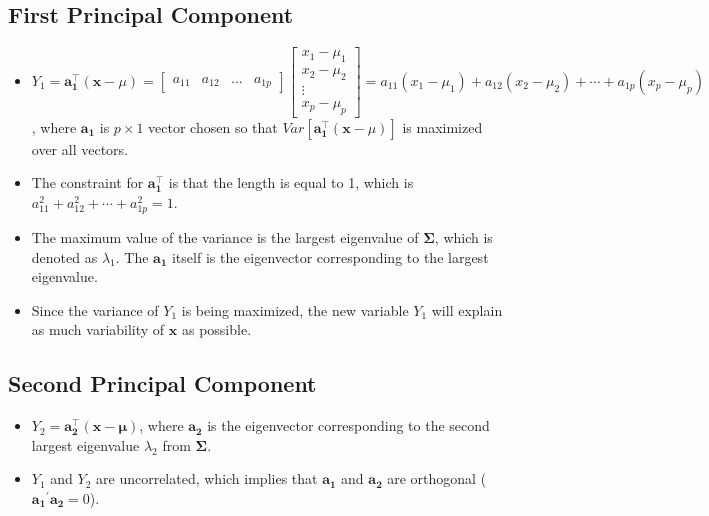 \documentclass{article}
\begin{document}
\subsection{First Principal Component}
\begin{itemize}
    \item 
        $Y_1=
        \mathbf{a_1^\intercal}(\mathbf{x}-\mu)=
        \begin{bmatrix} 
        a_{11} & a_{12} & \hdots & a_{1p}
        \end{bmatrix}
        \begin{bmatrix}
        x_1-\mu_1\\
        x_2-\mu_2\\
        \vdots\\
        x_p-\mu_p
        \end{bmatrix}
        =a_{11}(x_1-\mu_1)+a_{12}(x_2-\mu_2)+\cdots+a_{1p}(x_p-\mu_p)$, where $\mathbf{a_1}$ is $p\times 1$ vector chosen so that $Var[\mathbf{a_1^\intercal}(\mathbf{x}-\mu)]$ is maximized over all vectors. 
    \item 
        The constraint for $\mathbf{a_1^\intercal}$ is that the length is equal to 1, which is $a_{11}^2+a_{12}^2+\cdots+a_{1p}^2=1$.
    \item
        The maximum value of the variance is the largest eigenvalue of $\mathbf{\Sigma}$, which is denoted as $\lambda_1$. The $\mathbf{a_1}$ itself is the eigenvector corresponding to the largest eigenvalue.
    \item 
        Since the variance of $Y_1$ is being maximized, the new variable $Y_1$ will explain as much variability of $\mathbf{x}$ as possible.
\end{itemize}

\subsection{Second Principal Component}
\begin{itemize}
    \item 
    $Y_2=\mathbf{a_2^\intercal}(\mathbf{x}-\mathbf{\mu})$, where $\mathbf{a_2}$ is the eigenvector corresponding to the second largest eigenvalue $\lambda_2$ from $\mathbf{\Sigma}$.
    \item 
    $Y_1$ and $Y_2$ are uncorrelated, which implies that $\mathbf{a_1}$ and $\mathbf{a_2}$ are orthogonal ($\mathbf{a_1}^\prime \mathbf{a_2}=0$).
\end{itemize}
\end{document}
